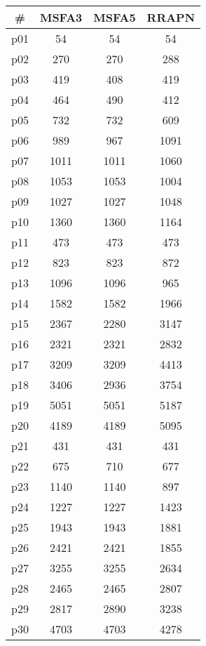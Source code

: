 \begin{tabular}{cccc}
\toprule
\textbf{\#} & \textbf{MSFA3} & \textbf{MSFA5} & \textbf{RRAPN}\\
\midrule
p01 & 54 & 54 & 54\\
p02 & 270 & 270 & 288\\
p03 & 419 & 408 & 419\\
p04 & 464 & 490 & 412\\
p05 & 732 & 732 & 609\\
p06 & 989 & 967 & 1091\\
p07 & 1011 & 1011 & 1060\\
p08 & 1053 & 1053 & 1004\\
p09 & 1027 & 1027 & 1048\\
p10 & 1360 & 1360 & 1164\\
p11 & 473 & 473 & 473\\
p12 & 823 & 823 & 872\\
p13 & 1096 & 1096 & 965\\
p14 & 1582 & 1582 & 1966\\
p15 & 2367 & 2280 & 3147\\
p16 & 2321 & 2321 & 2832\\
p17 & 3209 & 3209 & 4413\\
p18 & 3406 & 2936 & 3754\\
p19 & 5051 & 5051 & 5187\\
p20 & 4189 & 4189 & 5095\\
p21 & 431 & 431 & 431\\
p22 & 675 & 710 & 677\\
p23 & 1140 & 1140 & 897\\
p24 & 1227 & 1227 & 1423\\
p25 & 1943 & 1943 & 1881\\
p26 & 2421 & 2421 & 1855\\
p27 & 3255 & 3255 & 2634\\
p28 & 2465 & 2465 & 2807\\
p29 & 2817 & 2890 & 3238\\
p30 & 4703 & 4703 & 4278\\
\bottomrule
\end{tabular}

